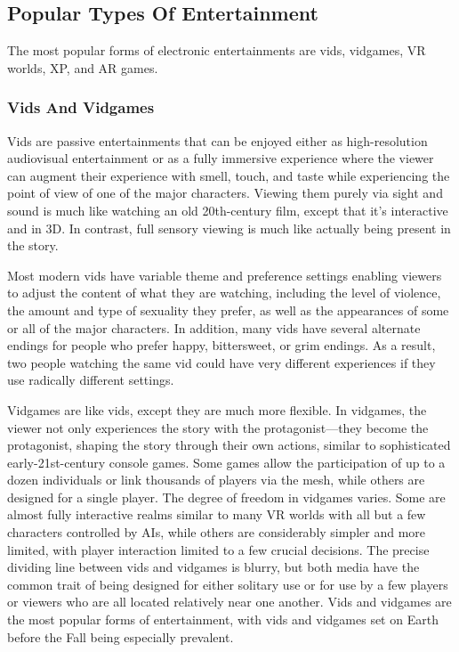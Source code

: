 \subsection{Popular Types Of Entertainment}

The most popular forms of electronic entertainments 
are vids, vidgames, VR worlds, XP, and AR games.

\subsubsection{Vids And Vidgames}

Vids are passive entertainments that can be enjoyed 
either as high-resolution audiovisual entertainment or 
as a fully immersive experience where the viewer can 
augment their experience with smell, touch, and taste 
while experiencing the point of view of one of the 
major characters. Viewing them purely via sight and 
sound is much like watching an old 20th-century film, 
except that it's interactive and in 3D. In contrast, full 
sensory viewing is much like actually being present in 
the story.

Most modern vids have variable theme and preference settings enabling viewers to adjust the content of 
what they are watching, including the level of violence, 
the amount and type of sexuality they prefer, as well 
as the appearances of some or all of the major characters. In addition, many vids have several alternate 
endings for people who prefer happy, bittersweet, or 
grim endings. As a result, two people watching the 
same vid could have very different experiences if they 
use radically different settings.

Vidgames are like vids, except they are much more 
flexible. In vidgames, the viewer not only experiences 
the story with the protagonist—they become the protagonist, shaping the story through their own actions, 
similar to sophisticated early-21st-century console 
games. Some games allow the participation of up to a 
dozen individuals or link thousands of players via the 
mesh, while others are designed for a single player. 
The degree of freedom in vidgames varies. Some are 
almost fully interactive realms similar to many VR 
worlds with all but a few characters controlled by AIs, 
while others are considerably simpler and more limited, with player interaction limited to a few crucial 
decisions. The precise dividing line between vids and 
vidgames is blurry, but both media have the common 
trait of being designed for either solitary use or for 
use by a few players or viewers who are all located 
relatively near one another. Vids and vidgames are 
the most popular forms of entertainment, with vids 
and vidgames set on Earth before the Fall being especially prevalent.

